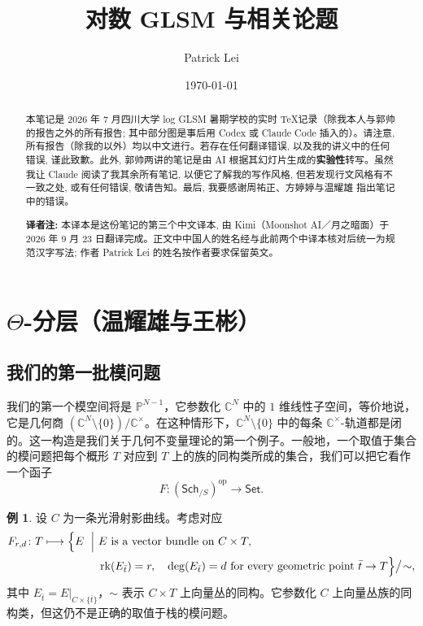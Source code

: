 \documentclass{amsart}
\title{对数 GLSM 与相关论题}
\author{Patrick Lei}
\date{\today}
\theoremstyle{definition}
\newtheorem{exm}[thm]{例}
\theoremstyle{remark}
\theoremstyle{plain}
\theoremstyle{definition}
\theoremstyle{remark}
\newcommand{\C}{\mathbb{C}}
\renewcommand{\P}{\mathbb{P}}
\newcommand{\mr}[1]{\mathrm{#1}}
\newcommand{\ms}[1]{\mathsf{#1}}
\newcommand{\1}{\mathbf{1}}
\newcommand{\2}{\mathbf{2}}
\newcommand{\3}{\mathbf{3}}
\begin{document}
    
\begin{abstract}
    本笔记是 2026 年 7 月四川大学 log GLSM 暑期学校的实时 \TeX 记录（除我本人与郭帅的报告之外的所有报告; 其中部分图是事后用 Codex 或 Claude Code 插入的）。请注意, 所有报告（除我的以外）均以中文进行。若存在任何翻译错误, 以及我的讲义中的任何错误, 谨此致歉。此外, 郭帅两讲的笔记是由 AI 根据其幻灯片生成的\textbf{实验性}转写。虽然我让 Claude 阅读了我其余所有笔记, 以便它了解我的写作风格, 但若发现行文风格有不一致之处, 或有任何错误, 敬请告知。最后, 我要感谢周祐正、方婷婷与温耀雄 指出笔记中的错误。

    \medskip
    \noindent\textbf{译者注: }本译本是这份笔记的第三个中文译本, 由 Kimi（Moonshot AI／月之暗面）于 2026 年 9 月 23 日翻译完成。正文中中国人的姓名经与此前两个中译本核对后统一为规范汉字写法; 作者 Patrick Lei 的姓名按作者要求保留英文。
\end{abstract}

\maketitle

\tableofcontents

\section{\(\Theta\)-分层（温耀雄与王彬）}%
\label{sec:Theta-stratifications}

\subsection{我们的第一批模问题}%
\label{sub:Our first moduli problem}

我们的第一个模空间将是 \(\P^{N-1}\)，它参数化 \(\C^N\) 中的 \(1\) 维线性子空间，等价地说，它是几何商 \((\C^N \setminus \{0\}) / \C^{\times}\)。在这种情形下，\(\C^N\setminus\{0\}\) 中的每条 \(\C^{\times}\)-轨道都是闭的。这一构造是我们关于几何不变量理论的第一个例子。一般地，一个取值于集合的模问题把每个概形 \(T\) 对应到 \(T\) 上的族的同构类所成的集合，我们可以把它看作一个函子
\[ F \colon (\ms{Sch}_{/S})^{\mr{op}} \to \ms{Set}. \]

\begin{exm}
    设 \(C\) 为一条光滑射影曲线。考虑对应
    \[
    \begin{aligned}
        F_{r,d}\colon T \longmapsto
        \Bigl\{
        E \ \Bigm|\ &
        E \text{ is a vector bundle on } C\times T,\\
        &\operatorname{rk}(E_{\bar t})=r,\quad \deg(E_{\bar t})=d
        \text{ for every geometric point } \bar t\to T
        \Bigr\}\big/\!\sim,
    \end{aligned}
    \]
    其中 \(E_{\bar t}=E|_{C\times\{\bar t\}}\)，\(\sim\) 表示 \(C\times T\) 上向量丛的同构。它参数化 \(C\) 上向量丛族的同构类，但这仍不是正确的取值于栈的模问题。
\end{exm}
\end{document}
